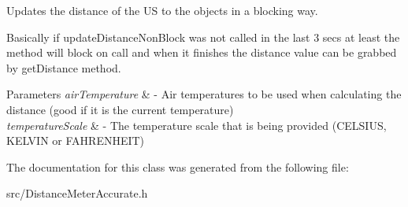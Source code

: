 Updates the distance of the US to the objects in a blocking way. 

Basically if update\+Distance\+Non\+Block was not called in the last 3 secs at least the method will block on call and when it finishes the distance value can be grabbed by get\+Distance method. 
\begin{DoxyParams}{Parameters}
{\em air\+Temperature} & -\/ Air temperatures to be used when calculating the distance (good if it is the current temperature) \\
\hline
{\em temperature\+Scale} & -\/ The temperature scale that is being provided (C\+E\+L\+S\+I\+US, K\+E\+L\+V\+IN or F\+A\+H\+R\+E\+N\+H\+E\+IT) \\
\hline
\end{DoxyParams}


The documentation for this class was generated from the following file\+:\begin{DoxyCompactItemize}
\item 
src/Distance\+Meter\+Accurate.\+h\end{DoxyCompactItemize}
